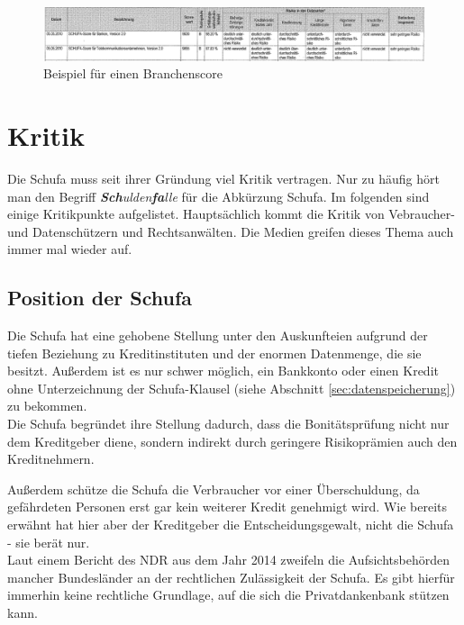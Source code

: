 \documentclass[12pt]{article}
\begin{document}
\begin{figure}[h!]
	\centering
		\includegraphics[width=\linewidth]{branchenscore}
	\caption{Beispiel für einen Branchenscore}
	\label{fig:bsp-branchenscore}
\end{figure}



\newpage


\section{Kritik}

Die Schufa muss seit ihrer Gründung viel Kritik vertragen. Nur zu häufig hört man den Begriff \textit{\textbf{Sch}ulden\textbf{fa}lle} für die Abkürzung Schufa. Im folgenden sind einige Kritikpunkte aufgelistet.
Hauptsächlich kommt die Kritik von Vebraucher- und Datenschützern und Rechtsanwälten. Die Medien greifen dieses Thema auch immer mal wieder auf.

\subsection{Position der Schufa}

Die Schufa hat eine gehobene Stellung unter den Auskunfteien aufgrund der tiefen Beziehung zu Kreditinstituten und der enormen Datenmenge, die sie besitzt. Außerdem ist es nur schwer möglich,
ein Bankkonto oder einen Kredit ohne Unterzeichnung der Schufa-Klausel (siehe Abschnitt \ref{sec:datenspeicherung}) zu bekommen.\\

Die Schufa begründet ihre Stellung dadurch, dass die Bonitätsprüfung nicht nur dem Kreditgeber diene, sondern indirekt durch geringere Risikoprämien auch den Kreditnehmern.

Außerdem schütze die Schufa die Verbraucher vor einer Überschuldung, da gefährdeten Personen erst gar kein weiterer Kredit genehmigt wird. Wie bereits erwähnt hat hier aber der Kreditgeber die 
Entscheidungsgewalt, nicht die Schufa - sie berät nur.\\

Laut einem Bericht des NDR aus dem Jahr 2014 zweifeln die Aufsichtsbehörden mancher Bundesländer an der rechtlichen Zulässigkeit der Schufa. Es gibt hierfür immerhin keine rechtliche Grundlage, auf die sich
die Privatdankenbank stützen kann.
\end{document}
